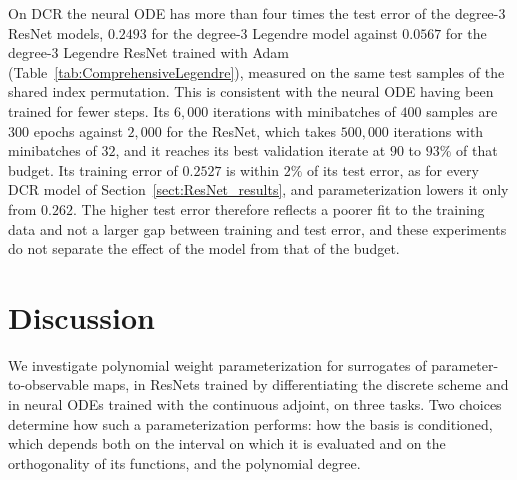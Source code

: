\documentclass[pdflatex,sn-mathphys-num]{sn-jnl}%
\theoremstyle{thmstyleone}%
\theoremstyle{thmstyletwo}%
\theoremstyle{thmstylethree}%
\begin{document}
On DCR the neural ODE has more than four times the test error of the degree-$3$ ResNet models, $0.2493$ for the degree-$3$ Legendre model against $0.0567$ for the degree-$3$ Legendre ResNet trained with Adam (Table~\ref{tab:ComprehensiveLegendre}), measured on the same test samples of the shared index permutation.
%
This is consistent with the neural ODE having been trained for fewer steps. Its $6{,}000$ iterations with minibatches of $400$ samples are $300$ epochs against $2{,}000$ for the ResNet, which takes $500{,}000$ iterations with minibatches of $32$, and it reaches its best validation iterate at $90$ to $93\%$ of that budget.
%
Its training error of $0.2527$ is within $2\%$ of its test error, as for every DCR model of Section~\ref{sect:ResNet_results}, and parameterization lowers it only from $0.262$. The higher test error therefore reflects a poorer fit to the training data and not a larger gap between training and test error, and these experiments do not separate the effect of the model from that of the budget.


\section{Discussion}\label{sect:discussion}
We investigate polynomial weight parameterization for surrogates of parameter-to-observable maps, in ResNets trained by differentiating the discrete scheme and in neural ODEs trained with the continuous adjoint, on three tasks.
%
Two choices determine how such a parameterization performs: how the basis is conditioned, which depends both on the interval on which it is evaluated and on the orthogonality of its functions, and the polynomial degree.
\end{document}
